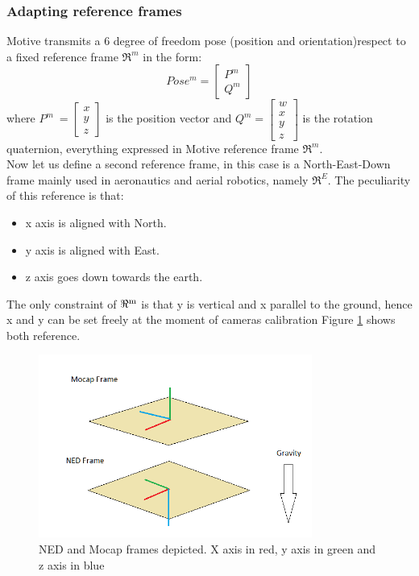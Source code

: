 \subsubsection{Adapting reference frames}
\label{sec:adaptframes}
Motive transmits a 6 degree of freedom pose (position and orientation)respect to a fixed reference frame $\Re^m$ in the form:\\ 
\begin{equation}
Pose^m = \begin{bmatrix}
P^m\\
Q^m
\end{bmatrix}
\end{equation}
 where $P^m\ = \begin{bmatrix}x\\y\\z\end{bmatrix}$ is the position vector and $Q^m =\begin{bmatrix}w\\x\\y\\z\end{bmatrix}$ is the rotation quaternion, everything expressed in Motive reference frame $\Re^m$. \\
 
 \noindent
Now let us define a second reference frame, in this case is a North-East-Down frame \cite{FrameRef}  mainly used in aeronautics and aerial robotics, namely  $\Re^E$. The peculiarity of this reference is that:

\begin{itemize}
\item x axis is aligned with North.
\item y axis is aligned with East.
\item z axis goes down towards the earth.
\end{itemize}

\noindent
The only constraint of $\Re\textsuperscript{m}$ is that y is vertical and x parallel to the ground, hence x and y can be set freely at the moment of cameras calibration Figure \ref{figure:frames} shows both reference.

\begin{figure}[h]
\centering
 \includegraphics[width=0.8\textwidth]{frames.png}
 \caption[NED and Mocap frames]{NED and Mocap frames depicted. X axis in red, y axis in green and z axis in blue}
 \label{figure:frames}
\end{figure}


